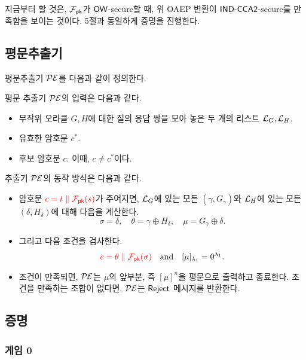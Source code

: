 지금부터 할 것은, $\mathcal{F}_{\textsf{pk}}$가 $\textsf{OW}$-secure할 때, 위 OAEP 변환이
$\textsf{IND-CCA2}$-secure를 만족함을 보이는 것이다. 5절과 동일하게 증명을 진행한다.

\newpage
\subsection{평문추출기}

평문추출기 $\mathcal{PE}$를 다음과 같이 정의한다.

\begin{tcolorbox}
	평문 추출기 $\mathcal{PE}$의 입력은 다음과 같다.
	\begin{itemize}
		\item 무작위 오라클 $G, H$에 대한 질의 응답 쌍을 모아 놓은 두 개의
		리스트 $\mathcal{L}_G, \mathcal{L}_H$.
		\item 유효한 암호문 $c^*$.
		\item 후보 암호문 $c$. 이때, $c \ne c^*$이다.
	\end{itemize}
	추출기 $\mathcal{PE}$의 동작 방식은 다음과 같다.
	\begin{itemize}
		\item 암호문 $\textcolor{red}{c = t \parallel \mathcal{F}_{\textsf{pk}}(s)}$가 주어지면, $\mathcal{L}_G$에 있는 모든
		$(\gamma, G_\gamma)$와 $\mathcal{L}_H$에 있는 모든 $(\delta, H_\delta)$에 대해
		다음을 계산한다. 
		$$
			\sigma = \delta, \quad 
			\theta = \gamma \oplus H_\delta, \quad 
			\mu = G_\gamma \oplus \delta.
		$$
		\item 그리고 다음 조건을 검사한다.
		$$
			\textcolor{red}{c = \theta \parallel \mathcal{F}_{\textsf{pk}}(\sigma)} \quad \text{and} \quad 
			[\mu]_{\lambda_1} = 0^{\lambda_1}.
		$$
		\item 조건이 만족되면, $\mathcal{PE}$는 $\mu$의 앞부분, 즉 $[\mu]^n$을 평문으로
		출력하고 종료한다. 조건을 만족하는 조합이 없다면, $\mathcal{PE}$는 $\textsf{Reject}$
		메시지를 반환한다.
	\end{itemize}
\end{tcolorbox}

\newpage
\subsection{증명}
\subsubsection{게임 0}

